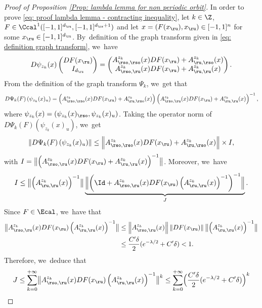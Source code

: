 \begin{appendix}
\begin{proof}[Proof of Proposition \ref{Prop: lambda lemma for non periodic orbit}]
In order to prove \eqref{eq: proof lambda lemma - contracting inequality}, let $k \in \Z$, $F \in \Ccal^{1} ([-1,1]^{d_\ru}, [-1,1]^{d_\rs + 1})$ and let $x = (F(x_\ru), x_\ru) \in [-1,1]^{n}$ for some $x_\ru \in [-1,1]^{d_\ru}$. By~definition of the graph transform given in \eqref{eq: definition graph transform}, we~have
\begin{equation}
D \psi_{z_k} (x) \begin{pmatrix}
DF (x_\ru) \\
I_{d_\ru} \\
\end{pmatrix}
= \begin{pmatrix}
A_{\rso,\rso}^{z_k} (x) DF (x_\ru) + A_{\ru,\rso}^{z_k} (x) \\
A_{\rso,\ru}^{z_k} (x) DF (x_\ru) + A_{\ru,\ru}^{z_k} (x)
\end{pmatrix}.
\end{equation}
From the definition of the graph transform $\Psi_k$, we~get that
\[
D \Psi_k (F) \left(\psi_{z_k} (x)_u \right) = \left(A_{\rso,\rso}^{z_k} (x) DF (x_\ru) + A_{\ru,\rso}^{z_k} (x) \right) \left(A_{\rso,\ru}^{z_k} (x) DF (x_\ru) + A_{\ru,\ru}^{z_k} (x) \right)^{-1},
\]
where $\psi_{z_k} (x) = (\psi_{z_k} (x)_{\rso}, \psi_{z_k} (x)_u)$. Taking the operator norm of $ D \Psi_k (F) \left(\psi_{z_k} (x)_u \right)$, we~get
\[
\left\| D \Psi_k (F) \left(\psi_{z_k} (x)_u \right) \right\| \leq \left\| A_{\rso,\rso}^{z_k} (x) DF (x_\ru) + A_{\ru,\rso}^{z_k} (x) \right\| \times I,
\]
with $I = \bigl\| \left(A_{\rso,\ru}^{z_k} (x) DF (x_\ru) + A_{\ru,\ru}^{z_k} (x) \right)^{-1} \bigr\|$. Moreover, we~have
\begin{equation}\label{eq: majoration inverse}
I \leq \bigl\| \left(A_{\ru,\ru}^{z_k} (x) \right)^{-1} \bigr\| \underbrace{\Bigl\| \left(\Id + A_{\rso,\ru}^{z_k} (x) DF (x_\ru) \left(A_{\ru,\ru}^{z_k} (x) \right)^{-1} \right)^{-1} \Bigr\|}_{J}.
\end{equation}
Since $F \in \Ecal$, we~have that
\begin{align*}
\bigl\| A_{\rso,\ru}^{z_k} (x) DF (x_\ru) \left(A_{\ru,\ru}^{z_k} (x) \right)^{-1} \bigr\| &\leq \left\| A_{\rso,\ru}^{z_k} (x)\right\| \left\| DF (x_\ru)\right\| \bigl\| \left(A_{\ru,\ru}^{z_k} (x) \right)^{-1} \bigr\| \\
&\leq \frac{C' \delta}{2} (e^{- \lambda/2 } + C' \delta) < 1.
\end{align*}
Therefore, we~deduce that
\begin{align*}
J &\leq \sum_{k = 0}^{+ \infty} \bigl\| A_{\rso,\ru}^{z_k} (x) DF (x_\ru) \left(A_{\ru,\ru}^{z_k} (x) \right)^{-1} \bigr\|^k \leq \sum_{k = 0}^{+ \infty} \Bigl(\frac{C' \delta}{2} (e^{- \lambda/2 } + C' \delta) \Bigr)^k \\

\end{align*}
\end{proof}
\end{appendix}
